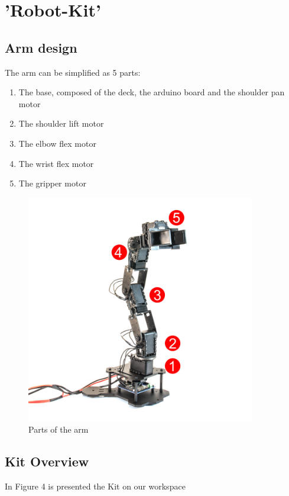 \documentclass[aps,letterpaper,11pt]{revtex4}
\begin{document}
	


\section{'Robot-Kit'}
\subsection{Arm design}

The arm can be simplified as 5 parts:

\begin{enumerate}
\item The base, composed of the deck, the arduino board and the shoulder pan motor
\item The shoulder lift motor
\item The elbow flex motor
\item The wrist flex motor
\item The gripper motor
\end{enumerate}


\begin{figure}[H]
	\centering
	\includegraphics[width=10cm]{ArmNumbers.jpg}
	\caption{Parts of the arm}
	\label{fig:Armparts}    
\end{figure}



\subsection{Kit Overview}
In Figure 4 is presented the Kit on our workspace
\end{document}
